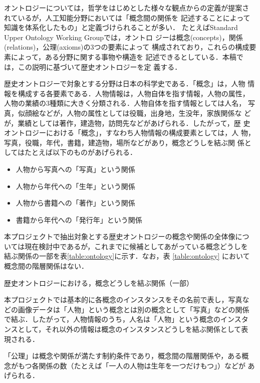\documentclass[japanese]{jnlp_1.4}
\begin{document}
オントロジーについては，哲学をはじめとした様々な観点からの定義が提案さ
れている\cite{mizoguchi1997}が，人工知能分野においては「概念間の関係を
記述することによって知識を体系化したもの」と定義づけられることが多い．
たとえばStandard Upper Ontology Working Group\cite{suo}では，オントロ
ジーは概念(concepts)，関係(relations)，公理(axioms)の3つの要素によって
構成されており，これらの構成要素によって，ある分野に関する事物や構造を
記述できるとしている．本稿では，この説明に基づいて歴史オントロジーを定
義する．

歴史オントロジーで対象とする分野は日本の科学史である．「概念」は，人物
情報を構成する各要素である．人物情報は，人物自体を指す情報，人物の属性，
人物の業績の3種類に大きく分類される．人物自体を指す情報としては人名，
写真，似顔絵などが，人物の属性としては役職，出身地，生没年，家族関係な
どが，業績としては著作，建造物，訪問先などがあげられる．したがって，歴
史オントロジーにおける「概念」，すなわち人物情報の構成要素としては，人
物，写真，役職，年代，書籍，建造物，場所などがあり，概念どうしを結ぶ関
係としてはたとえば以下のものがあげられる．
\begin{itemize}
\item 人物から写真への「写真」という関係
\item 人物から年代への「生年」という関係
\item 人物から書籍への「著作」という関係
\item 書籍から年代への「発行年」という関係
\end{itemize}
本プロジェクトで抽出対象とする歴史オントロジーの概念や関係の全体像につ
いては現在検討中であるが，これまでに候補としてあがっている概念どうしを
結ぶ関係の一部を表\ref{table:ontology}に示す．なお，表
\ref{table:ontology} において概念間の階層関係はない．

\begin{table}[t]
\caption{歴史オントロジーにおける，概念どうしを結ぶ関係（一部）}
\label{table:ontology}
\begin{center}

\end{center}
\end{table}

本プロジェクトでは基本的に各概念のインスタンスをその名前で表し，写真な
どの画像データは「人物」という概念とは別の概念として「写真」などの関係
で結ぶ．したがって，人物情報のうち，人名は「人物」という概念のインスタ
ンスとして，それ以外の情報は概念のインスタンスどうしを結ぶ関係として表
現される．

「公理」は概念や関係が満たす制約条件であり，概念間の階層関係や，ある概
念がもつ各関係の数（たとえば「一人の人物は生年を一つだけもつ」）などが
あげられる．
\end{document}
